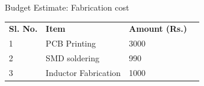 \documentclass[aspectratio=169]{beamer}
\begin{document}
\begin{frame}{Budget Estimate: Fabrication cost}
\begin{table}[]
	\begin{tabular}{|l|l|l|l}
		\cline{1-3}
		\textbf{Sl. No.} & \textbf{Item}        & \textbf{Amount (Rs.)} &  \\ \cline{1-3}
		1                & PCB Printing         & 3000                    &  \\ \cline{1-3}
		2                & SMD soldering        & 990                    &  \\ \cline{1-3}
		3                & Inductor Fabrication & 1000                  &  \\ \cline{1-3}
	\end{tabular}
\end{table}
\end{frame}
\end{document}
